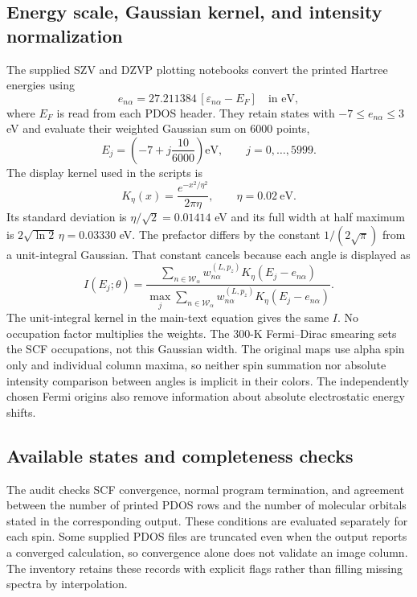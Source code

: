 \documentclass[aps,prl,10pt,onecolumn,superscriptaddress,longbibliography]{revtex4-2}
\begin{document}
\subsection{Energy scale, Gaussian kernel, and intensity normalization}

The supplied SZV and DZVP plotting notebooks convert the printed Hartree energies using
\begin{equation}
 e_{n\alpha}=27.211384\,[\varepsilon_{n\alpha}-E_F]\quad\text{in eV},
\end{equation}
where $E_F$ is read from each PDOS header. They retain states with $-7\leq e_{n\alpha}\leq3$ eV and evaluate their weighted Gaussian sum on 6000 points,
\begin{equation}
 E_j=\left(-7+j\frac{10}{6000}\right)\mathrm{eV},\qquad j=0,\ldots,5999.
\end{equation}
The display kernel used in the scripts is
\begin{equation}
 K_\eta(x)=\frac{e^{-x^2/\eta^2}}{2\pi\eta},\qquad \eta=0.02\ \mathrm{eV}.
\end{equation}
Its standard deviation is $\eta/\sqrt2=0.01414$ eV and its full width at half maximum is $2\sqrt{\ln2}\,\eta=0.03330$ eV. The prefactor differs by the constant $1/(2\sqrt\pi)$ from a unit-integral Gaussian. That constant cancels because each angle is displayed as
\begin{equation}
 I(E_j;\theta)=\frac{\sum_{n\in\mathcal W_\alpha}w^{(L,p_z)}_{n\alpha}K_\eta(E_j-e_{n\alpha})}
 {\max_j\sum_{n\in\mathcal W_\alpha}w^{(L,p_z)}_{n\alpha}K_\eta(E_j-e_{n\alpha})}.
\end{equation}
The unit-integral kernel in the main-text equation gives the same $I$. No occupation factor multiplies the weights. The 300-K Fermi--Dirac smearing sets the SCF occupations, not this Gaussian width. The original maps use alpha spin only and individual column maxima, so neither spin summation nor absolute intensity comparison between angles is implicit in their colors. The independently chosen Fermi origins also remove information about absolute electrostatic energy shifts.

\subsection{Available states and completeness checks}

The audit checks SCF convergence, normal program termination, and agreement between the number of printed PDOS rows and the number of molecular orbitals stated in the corresponding output. These conditions are evaluated separately for each spin. Some supplied PDOS files are truncated even when the output reports a converged calculation, so convergence alone does not validate an image column. The inventory retains these records with explicit flags rather than filling missing spectra by interpolation.
\end{document}
